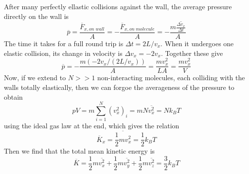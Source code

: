 \documentclass[12pt, a4paper, oneside, openright, titlepage]{book}
\begin{document}
\begin{center}
\end{center}

After many perfectly ellastic collisions against the wall, the average pressure directly on the wall is \begin{equation*}
    \overline{p} = \frac{\overline{F}_{x,on\;wall}}{A} = -\frac{\overline{F}_{x,on\;molecule}}{A} = -\frac{m\overline{\frac{\Delta v_x}{\Delta t}}}{A} 
\end{equation*}
The time it takes for a full round trip is $\Delta t = 2L/v_x$. When it undergoes one elastic collision, its change in velocity is $\Delta v_x = -2v_x$. Together these give \begin{equation*}
    \overline{p} = -\frac{m(-2v_x/(2L/v_x))}{A} = \frac{mv_x^2}{LA} = \frac{mv_x^2}{V}
\end{equation*}
Now, if we extend to $N >> 1$ non-interacting molecules, each colliding with the walls totally elastically, then we can forgoe the averageness of the pressure to obtain \begin{equation*}
    pV = m\sum_{i=1}^N(v_x^2)_i = mN\overline{v_x^2} = Nk_BT
\end{equation*}
using the ideal gas law at the end, which gives the relation \begin{equation*}
    \overline{K}_x = \overline{\frac{1}{2}mv_x^2} = \frac{1}{2}k_BT
\end{equation*}
Then we find that the total mean kinetic energy is \begin{equation}
    \overline{K} = \frac{1}{2}m\overline{v_x^2}+\frac{1}{2}m\overline{v_y^2}+\frac{1}{2}m\overline{v_z^2} = \frac{3}{2}k_BT
\end{equation}
\end{document}
